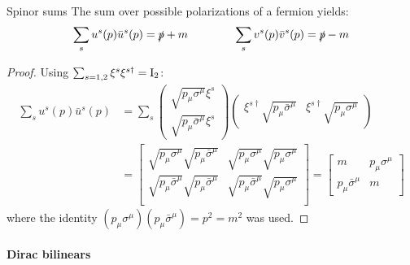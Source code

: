 \begin{proposition}{Spinor sums}{}
  The sum over possible polarizations of a fermion yields:
  \begin{equation}
    \sum_s u^s(p) \bar{u}^s(p) = \slashed{p} + m
    \qquad \qquad
    \sum_s v^s(p) \bar{v}^s(p) = \slashed{p} - m
    \label{eq:1.96}
  \end{equation}
  
  \tcblower

  \begin{proof}
    Using $ \sum_{s = 1,2} \xi^s \xi^{s \dagger} = \mathrm{I}_2 $:
    \begin{equation*}
      \begin{split}
        \sum_s u^s(p) \bar{u}^s(p)
        &= \sum_s
        \begin{pmatrix} \sqrt{p_\mu \sigma^\mu} \xi^s \\ \sqrt{p_\mu \bar{\sigma}^\mu} \xi^s \end{pmatrix}
        \begin{pmatrix} \xi^{s \dagger} \sqrt{p_\mu \bar{\sigma}^\mu} & \xi^{s \dagger} \sqrt{p_\mu \sigma^\mu} \end{pmatrix} \\
        &=
        \begin{bmatrix}
          \sqrt{p_\mu \sigma^\mu} \sqrt{p_\mu \bar{\sigma}^\mu} & \sqrt{p_\mu \sigma^\mu} \sqrt{p_\mu \sigma^\mu} \\
          \sqrt{p_\mu \bar{\sigma}^\mu} \sqrt{p_\mu \bar{\sigma}^\mu} & \sqrt{p_\mu \bar{\sigma}^\mu} \sqrt{p_\mu \sigma^\mu} \\
        \end{bmatrix}
        =
        \begin{bmatrix}
          m & p_\mu \sigma^\mu \\ p_\mu \bar{\sigma}^\mu & m
        \end{bmatrix}
      \end{split}
    \end{equation*}
    where the identity $ (p_\mu \sigma^\mu) (p_\mu \bar{\sigma}^\mu) = p^2 = m^2 $ was used.
  \end{proof}
\end{proposition}

\paragraph{Dirac bilinears}


